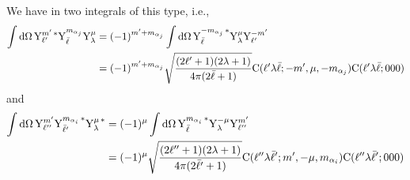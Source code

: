 \documentclass[aps,pra,groupedaddress,12pt,
               amsfonts,amssymb,
               preprint
    ]{revtex4}
\begin{document}
We have in  two integrals of this type, i.e., 
\begin{equation}
  \label{eq:shadda}
  \begin{split}
  \int\mathrm{d}\Omega\,\mathrm{Y}_{\ell'}^{m'\,*}\mathrm{Y}_{\bar{\ell}}^{m_{\alpha_j}}\mathrm{Y}_{\lambda}^{\mu}
  & =
  (-1)^{m'+m_{{\alpha_j}}}\int\mathrm{d}\Omega\,\mathrm{Y}_{\bar{\ell}}^{-m_{\alpha_j}\,*}\mathrm{Y}_{\lambda}^{\mu}\mathrm{Y}_{\ell'}^{-m'} \\
  & = (-1)^{m'+m_{\alpha_j}}\sqrt{\dfrac{(2\ell'+1)(2\lambda+1)}{4\pi(2\bar{\ell}+1)}}\mathrm{C}(\ell'\lambda\bar{\ell};-m',\mu,-m_{\alpha_j})\mathrm{C}(\ell'\lambda\bar{\ell};000)
  \end{split}
\end{equation}
and
\begin{equation}
  \label{eq:shaddb}
  \begin{split}
  \int\mathrm{d}\Omega\,\mathrm{Y}_{\ell''}^{m'}\mathrm{Y}_{\bar{\ell}'}^{m_{\alpha_i}\,*}\mathrm{Y}_{\lambda}^{\mu\,*}
  & =
  (-1)^{\mu}\int\mathrm{d}\Omega\,\mathrm{Y}_{\bar{\ell}}^{m_{\alpha_i}\,*}\mathrm{Y}_{\lambda}^{-\mu}\mathrm{Y}_{\ell''}^{m'} \\
  & = (-1)^{\mu}\sqrt{\dfrac{(2\ell''+1)(2\lambda+1)}{4\pi(2\bar{\ell}'+1)}}\mathrm{C}(\ell''\lambda\bar{\ell}';m',-\mu,m_{\alpha_i})\mathrm{C}(\ell''\lambda\bar{\ell}';000)
  \end{split}
\end{equation}
\end{document}
